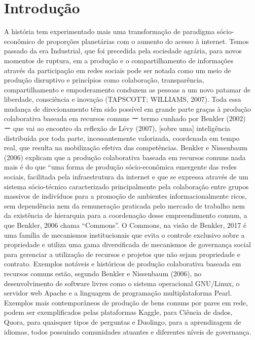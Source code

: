 \pagestyle{fancy}

\chapter{Introdução}\label{intro}

A história tem experimentado mais uma transformação de paradigma  sócio-econômico de proporções planetárias com o aumento do acesso à internet. Temos passado da era Industrial, que foi precedida pela sociedade agrária, para novos momentos de ruptura, em a produção e o compartilhamento de informações através da participação em redes sociais pode ser notada como um meio de produção disruptivo e princípios como colaboração, transparência, compartilhamento e empoderamento conduzem as pessoas a um novo patamar de liberdade, consciência e inovação (TAPSCOTT; WILLIAMS, 2007).
Toda essa mudança de direcionamento têm sido possível em grande parte graças à produção colaborativa baseada em recursos comuns ー termo cunhado por Benkler (2002) ー que vai ao encontro da reflexão de Lévy (2007), [sobre  uma] inteligência distribuída por toda parte, incessantemente valorizada, coordenada em tempo real, que resulta na mobilização efetiva das competências.
Benkler e Nissenbaum (2006) explicam que a produção colaborativa baseada em recursos comuns nada mais é do que “uma forma de produção sócio-econômica emergente das redes sociais, facilitada pela infraestrutura da internet e que se expressa através de um sistema sócio-técnico caracterizado principalmente pela colaboração entre grupos massivos de indivíduos para a promoção de ambientes informacionalmente ricos, sem dependência nem da remuneração praticada pelo mercado de trabalho nem da existência de hierarquia para a coordenação desse empreendimento comum, a que Benkler, 2006 chama “Commons”. 
O Commons, na visão de Benkler, 2017 é uma família de mecanismos institucionais que evita o controle exclusivo sobre a propriedade e utiliza uma gama diversificada de mecanismos de governança social para gerenciar a utilização de recursos e projetos que não sejam propriedade e contrato.
Exemplos notáveis e históricos de produção colaborativa baseada em recursos comuns estão, segundo Benkler e Nissenbaum (2006), no desenvolvimento de software livres como o sistema operacional GNU/Linux, o servidor web Apache e a linguagem de programação multiplataforma Pearl. Exemplos mais contemporâneos de produção de bens comuns por pares em rede, podem ser exemplificados pelas plataformas Kaggle, para Ciência de dados, Quora, para quaisquer tipos de perguntas e Duolingo, para a aprendizagem de idiomas, todos possuindo comunidades atuantes e diferentes níveis de governança. 
